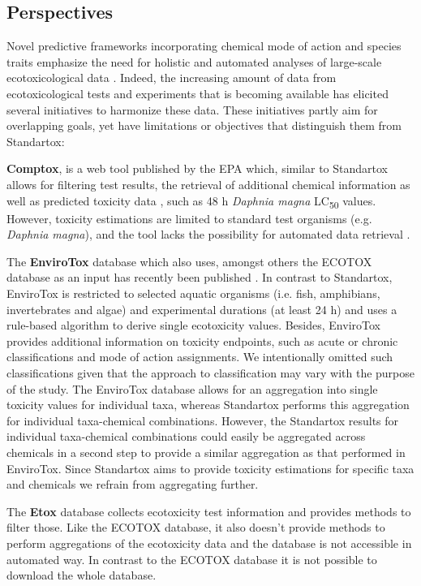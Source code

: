 \documentclass[journal,datadescriptor,accept,moreauthors,pdftex]{Definitions/mdpi}
\begin{document}
\subsection{Perspectives}
Novel predictive frameworks incorporating chemical mode of action and species traits emphasize the need for holistic and automated analyses of large-scale ecotoxicological data \citep{malaj_evolutionary_2016, vandenberg_modeling_2019}. Indeed, the increasing amount of data from ecotoxicological tests and experiments that is becoming available has elicited several initiatives to harmonize these data. These initiatives partly aim for overlapping goals, yet have limitations or objectives that distinguish them from Standartox:
\par
\textbf{Comptox}, is a web tool published by the EPA which, similar to Standartox allows for filtering test results, the retrieval of additional chemical information as well as predicted toxicity data \citep{martin_prediction_2001}, such as 48 h \textit{Daphnia magna} LC\textsubscript{50} values. However, toxicity estimations are limited to standard test organisms (e.g. \textit{Daphnia magna}), and the tool lacks the possibility for automated data retrieval \citep{williams_comptox_2017}.
\par
The \textbf{EnviroTox} database which also uses, amongst others the ECOTOX database as an input has recently been published \citep{healthandenvironmentalsciencesinstitutehesi_envirotox_2019, connors_creation_2019}. In contrast to Standartox, EnviroTox  is restricted to selected aquatic organisms (i.e. fish, amphibians, invertebrates and algae) and experimental durations (at least 24 h) and uses a rule-based algorithm to derive single ecotoxicity values. Besides, EnviroTox provides additional information on toxicity endpoints, such as acute or chronic classifications and mode of action assignments. We intentionally omitted such classifications given that the approach to classification may vary with the purpose of the study. The EnviroTox database allows for an aggregation into single toxicity values for individual taxa, whereas Standartox performs this aggregation for individual taxa-chemical combinations. However, the Standartox results for individual taxa-chemical combinations could easily be aggregated across chemicals in a second step to provide a similar aggregation as that performed in EnviroTox. Since Standartox aims to provide toxicity estimations for specific taxa and chemicals we refrain from aggregating further.
\par
The \textbf{Etox} database collects ecotoxicity test information and provides methods to filter those. Like the ECOTOX database, it also doesn't provide methods to perform aggregations of the ecotoxicity data and the database is not accessible in automated way. In contrast to the ECOTOX database it is not possible to download the whole database.
\end{document}
